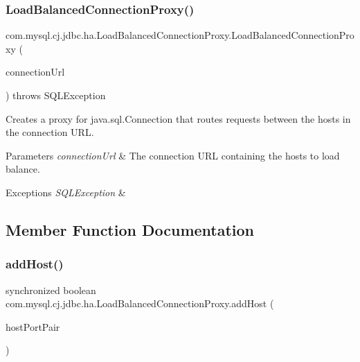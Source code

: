\subsubsection{\texorpdfstring{Load\+Balanced\+Connection\+Proxy()}{LoadBalancedConnectionProxy()}}
{\footnotesize\ttfamily com.\+mysql.\+cj.\+jdbc.\+ha.\+Load\+Balanced\+Connection\+Proxy.\+Load\+Balanced\+Connection\+Proxy (\begin{DoxyParamCaption}\item[{\mbox{\hyperlink{classcom_1_1mysql_1_1cj_1_1conf_1_1url_1_1_loadbalance_connection_url}{Loadbalance\+Connection\+Url}}}]{connection\+Url }\end{DoxyParamCaption}) throws S\+Q\+L\+Exception}

Creates a proxy for java.\+sql.\+Connection that routes requests between the hosts in the connection U\+RL.


\begin{DoxyParams}{Parameters}
{\em connection\+Url} & The connection U\+RL containing the hosts to load balance. \\
\hline
\end{DoxyParams}

\begin{DoxyExceptions}{Exceptions}
{\em S\+Q\+L\+Exception} & \\
\hline
\end{DoxyExceptions}


\subsection{Member Function Documentation}
\mbox{\label{classcom_1_1mysql_1_1cj_1_1jdbc_1_1ha_1_1_load_balanced_connection_proxy_a02279adacc22183bb7e8c8a4d6e61d5a}} 
\subsubsection{\texorpdfstring{add\+Host()}{addHost()}}
{\footnotesize\ttfamily synchronized boolean com.\+mysql.\+cj.\+jdbc.\+ha.\+Load\+Balanced\+Connection\+Proxy.\+add\+Host (\begin{DoxyParamCaption}\item[{String}]{host\+Port\+Pair }\end{DoxyParamCaption})}

